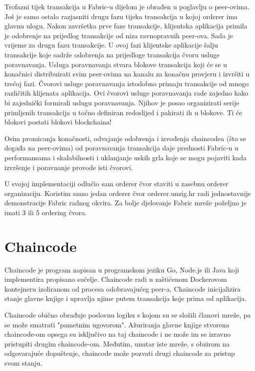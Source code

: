 \documentclass[times, utf8, diplomski]{fer}
\begin{document}
Trofazni tijek transakcija u Fabric-u dijelom je obrađen u poglavlju o peer-ovima.  Još je samo ostalo razjasniti drugu fazu tijeka transakcija u kojoj orderer ima glavnu ulogu.  Nakon završetka prve faze transakcije, klijentska aplikacija primila je odobrenje na prijedlog transakcije od niza ravnopravnih peer-ova. Sada je vrijeme za drugu fazu transakcije. U ovoj fazi klijentske aplikacije šalju transakcije koje sadrže odobrenja na prijedloge transakcija čvoru usluge poravnavanja. Usluga poravnavanja stvara blokove transakcija koji će se u konačnici distribuirati svim peer-ovima na kanalu za konačnu provjeru i izvršiti u trećoj fazi. Čvorovi usluge poravnavanja istodobno primaju transakcije od mnogo različitih klijenata aplikacija. Ovi čvorovi usluge poravnavanja rade zajedno kako bi zajednički formirali uslugu poravnavanja. Njihov je posao organizirati serije primljenih transakcija u točno definiran redoslijed i pakirati ih u blokove. Ti će blokovi postati blokovi blockchaina!

Osim promicanja konačnosti,  odvajanje odobrenja i izvođenja chaincodea (što se događa na peer-ovima) od poravnavanja transakcija daje prednosti Fabric-u u performansama i skalabilnosti i uklanjanje uskih grla koje se mogu pojaviti kada izvršenje i poravnanje provode isti čvorovi.

U svojoj implementaciji odlučio sam orderer čvor staviti u zasebnu orderer organizaciju.  Koristim samo jedan orderer čvor orderer.unzig.hr radi jednostavnije demonstracije Fabric radnog okvira. Za bolje djelovanje Fabric mreže poželjno je imati 3 ili 5 ordering čvora. 


\section{Chaincode}
Chaincode je program napisan u programskom jeziku Go,  Node.js ili Java koji implementira propisano sučelje.  Chaincode radi u zaštićenom Dockerovom kontejneru izoliranom od procesa odobravajućeg peer-a.  Chaincode inicijalizira stanje glavne knjige i upravlja njime putem transakcija koje prima od aplikacija. \cite{Fabric}


Chaincode obično obrađuje poslovnu logiku s kojom su se složili članovi mreže, pa se može smatrati "pametnim ugovorom". Ažuriranja glavne knjige stvorena chaincode-om opsega su isključivo na taj chaincode i ne može im se izravno pristupiti drugim chaincode-om. Međutim, unutar iste mreže, s obzirom na odgovarajuće dopuštenje,  chaincode može pozvati drugi chaincode za pristup svom stanju.
\end{document}
